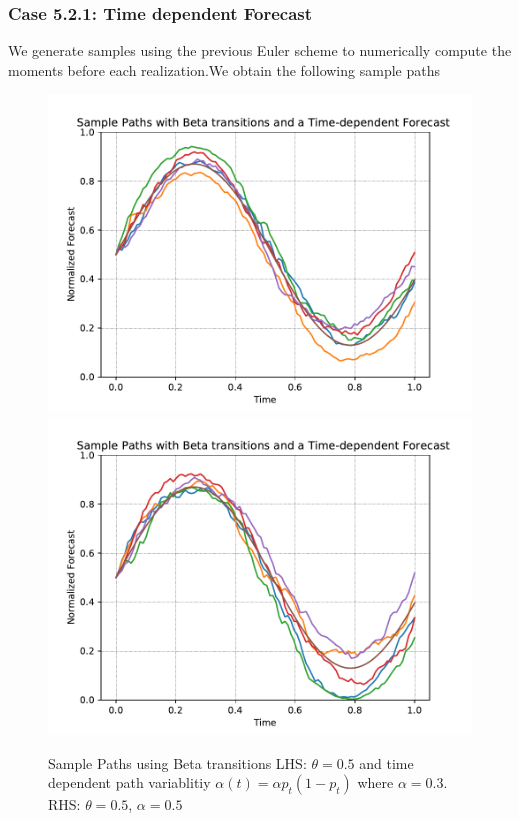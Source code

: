 \documentclass[aspectratio=169]{beamer}\usepackage[utf8]{inputenc}
\begin{document}
\begin{frame}\frametitle{ Case 5.2.1: Time dependent Forecast  }
We generate samples using the previous Euler scheme to numerically compute the moments before each realization.We obtain the following sample paths
\begin{figure}
    \includegraphics[scale=0.33]{Figures/sample_paths_beta_flex_0503.pdf}
        \includegraphics[scale=0.33]{Figures/sample_paths_beta_flex_0505.pdf}
      
  \caption{ Sample Paths using Beta transitions LHS: $\theta = 0.5$ and time dependent path variablitiy $\alpha (t) =  \alpha p_t (1-p_t)$ where $\alpha=0.3$. RHS:  $\theta = 0.5$, $\alpha=0.5$   }
\end{figure}

\end{frame}
\end{document}
